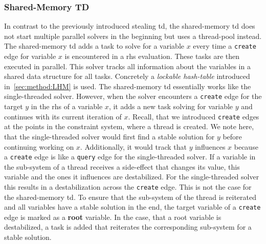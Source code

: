     \subsubsection{Shared-Memory TD}
    \label{sec:method:td_parallel:sharedMem}
    In contrast to the previously introduced stealing \ac{td}, the shared-memory \ac{td} does not start multiple parallel solvers in the beginning but uses a thread-pool instead. The shared-memory \ac{td} adds a task to solve for a variable $x$ every time a \texttt{create} edge for variable $x$ is encountered in a \ac{rhs} evaluation. These tasks are then executed in parallel.
    This solver tracks all information about the variables in a shared data structure for all tasks. Concretely a \textit{lockable hash-table} introduced in~\autoref{sec:method:LHM} is used.
    The shared-memory \ac{td} essentially works like the single-threaded solver. However, when the solver encounters a \texttt{create} edge for the target $y$ in the \ac{rhs} of a variable $x$, it adds a new task solving for variable $y$ and continues with its current iteration of $x$. Recall, that we introduced \texttt{create} edges at the points in the constraint system, where a thread is created. We note here, that the single-threaded solver would first find a stable solution for $y$ before continuing working on $x$. Additionally, it would track that $y$ influences $x$ because a \texttt{create} edge is like a \texttt{query} edge for the single-threaded solver. If a variable in the sub-system of a thread receives a side-effect that changes its value, this variable and the ones it influences are destabilized. For the single-threaded solver this results in a destabilization across the \texttt{create} edge. This is not the case for the shared-memory \ac{td}. To ensure that the sub-system of the thread is reiterated and all variables have a stable solution in the end, the target variable of a \texttt{create} edge is marked as a \textbf{root} variable. In the case, that a root variable is destabilized, a task is added that reiterates the corresponding sub-system for a stable solution.

